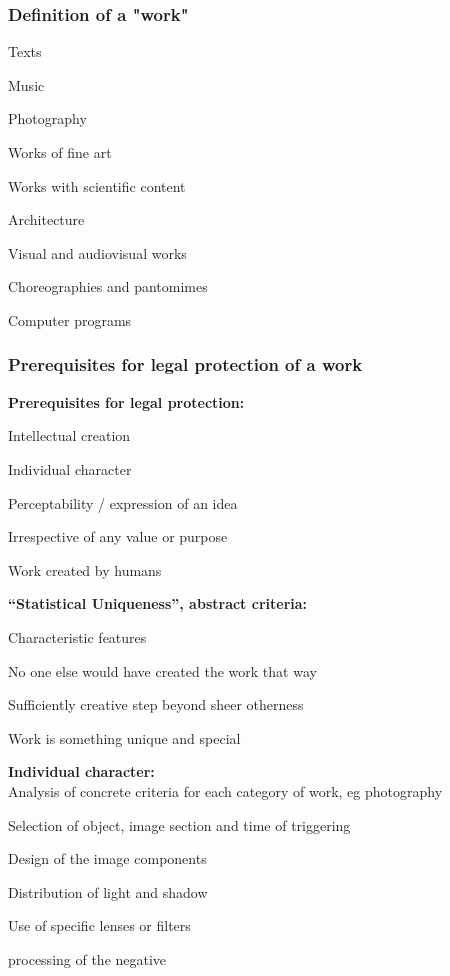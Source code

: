 \subsubsection{Definition of a "work"}
\begin{compactitem}
	\item Texts
	\item Music
	\item Photography
	\item Works of fine art
	\item Works with scientific content
	\item Architecture
	\item Visual and audiovisual works
	\item Choreographies and pantomimes
	\item Computer programs
\end{compactitem}

\subsubsection{Prerequisites for legal protection of a work}
\textbf{Prerequisites for legal protection:}
\begin{compactitem}
	\item Intellectual creation
	\item Individual character
	\item Perceptability / expression of an idea
	\item Irrespective of any value or purpose
	\item Work created by humans
\end{compactitem}
\textbf{“Statistical Uniqueness”, abstract criteria:}
\begin{compactitem}
	\item Characteristic features
	\item No one else would have created the work that way
	\item Sufficiently creative step beyond sheer otherness
	\item Work is something unique and special
\end{compactitem}
\textbf{Individual character:} \\
Analysis of concrete criteria for each category of work, eg photography
\begin{compactitem}
	\item Selection of object, image section and time of triggering
	\item Design of the image components
	\item Distribution of light and shadow
	\item Use of specific lenses or filters
	\item processing of the negative
\end{compactitem}

